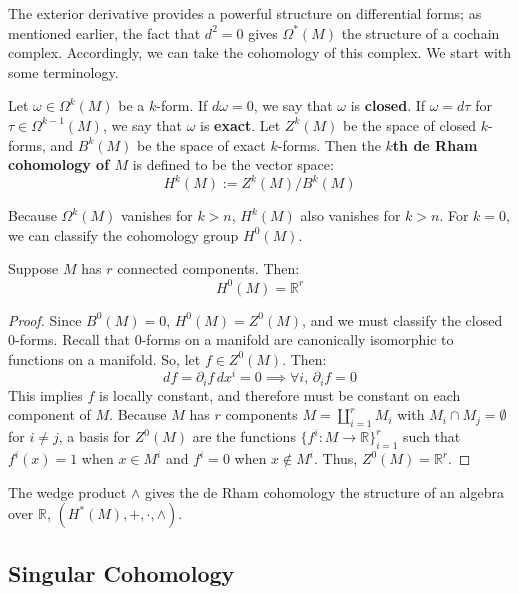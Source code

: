 The exterior derivative provides a powerful structure on differential forms; as mentioned earlier, the fact that $d^2 = 0$ gives 
$\Omega^*(M)$ the structure of a cochain complex. Accordingly, we can take the cohomology of this complex. We start 
with some terminology.
\begin{definition}
	Let $\omega\in\Omega^k(M)$ be a $k$-form. If $d\omega = 0$, we say that $\omega$ is \textbf{closed}. If $\omega = 
	d\tau$ for $\tau\in\Omega^{k - 1}(M)$, we say that $\omega$ is \textbf{exact}. Let $Z^k(M)$ be the space of closed 
	$k$-forms, and $B^k(M)$ be the space of exact $k$-forms. Then the \textbf{$k$th de Rham cohomology of $M$} is 
	defined to be the vector space:
	\begin{equation}
		H^k(M) := Z^k(M) / B^k(M)
	\end{equation}
\end{definition}

Because $\Omega^k(M)$ vanishes for $k > n$, $H^k(M)$ also vanishes for $k > n$. For $k = 0$, we can classify 
the cohomology group $H^0(M)$.
\begin{theorem}
	Suppose $M$ has $r$ connected components. Then:
	\begin{equation}
		H^0(M) = \mathbb R^r
	\end{equation}
\end{theorem}
\begin{proof}
	Since $B^0(M) = 0$, $H^0(M) = Z^0(M)$, and we must classify the closed $0$-forms. Recall that 0-forms on a manifold 
	are canonically isomorphic to functions on a manifold. So, let $f\in Z^0(M)$. Then:
	\begin{equation}
		df = \partial_i f\, dx^i = 0\implies \forall i,\,\partial_i f = 0
	\end{equation}
	This implies $f$ is locally constant, and therefore must be constant on each component of $M$. Because $M$ has $r$ 
	components $M = \coprod_{i = 1}^r M_i$ with $M_i\cap M_j = \emptyset$ for $i\neq j$, a basis for $Z^0(M)$ are the 
	functions $\{f^i : M\rightarrow\mathbb R\}_{i = 1}^r$ such that $f^i(x) = 1$ when $x\in M^i$ and $f^i = 0$ when $x\not\in 
	M^i$. Thus, $Z^0(M) = \mathbb R^r$. 
\end{proof}

The wedge product $\wedge$ gives the de Rham cohomology the structure of an algebra over $\mathbb R$, $(H^*(M), +, 
\cdot, \wedge)$. 

\subsection{Singular Cohomology}

